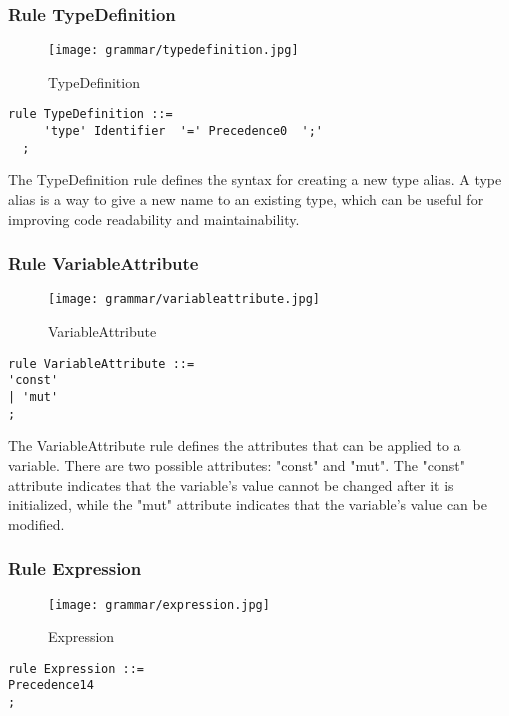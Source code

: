 \subsubsection*{Rule TypeDefinition}

\begin{figure}[!ht]
\centering
\texttt{[image: grammar/typedefinition.jpg]}
\caption{TypeDefinition}
\end{figure}

\begin{lstlisting}
rule TypeDefinition ::=
     'type' Identifier  '=' Precedence0  ';' 
  ;
\end{lstlisting}

The TypeDefinition rule defines the syntax for creating a new type alias. A type alias is a way to give a new name to an existing type, which can be useful for improving code readability and maintainability.

\subsubsection*{Rule VariableAttribute}

\begin{figure}[!ht]
\centering
\texttt{[image: grammar/variableattribute.jpg]}
\caption{VariableAttribute}
\end{figure}

\begin{lstlisting}
rule VariableAttribute ::=
'const'
| 'mut'
;
\end{lstlisting}

The VariableAttribute rule defines the attributes that can be applied to a variable. There are two possible attributes: "const" and "mut". The "const" attribute indicates that the variable's value cannot be changed after it is initialized, while the "mut" attribute indicates that the variable's value can be modified.

\subsubsection*{Rule Expression}

\begin{figure}[!ht]
\centering
\texttt{[image: grammar/expression.jpg]}
\caption{Expression}
\end{figure}

\begin{lstlisting}
rule Expression ::=
Precedence14
;
\end{lstlisting}

